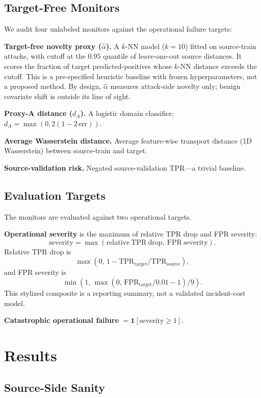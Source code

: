 \documentclass[10pt,conference]{IEEEtran}
\begin{document}
\subsection{Target-Free Monitors}
\label{sec:monitors}

We audit four unlabeled monitors against the operational failure targets:

\textbf{Target-free novelty proxy ($\hat{\alpha}$).} A $k$-NN model ($k{=}10$) fitted on source-train attacks, with cutoff at the $0.95$ quantile of leave-one-out source distances. It scores the fraction of target predicted-positives whose $k$-NN distance exceeds the cutoff. This is a pre-specified heuristic baseline with frozen hyperparameters, not a proposed method. By design, $\hat{\alpha}$ measures attack-side novelty only; benign covariate shift is outside its line of sight.

\textbf{Proxy-A distance ($d_A$).} A logistic domain classifier; $d_A = \max(0, 2(1 - 2\,\mathrm{err}))$.

\textbf{Average Wasserstein distance.} Average feature-wise transport distance (1D Wasserstein) between source-train and target.

\textbf{Source-validation risk.} Negated source-validation TPR---a trivial baseline.

\subsection{Evaluation Targets}

The monitors are evaluated against two operational targets.

\textbf{Operational severity} is the maximum of relative TPR drop and FPR severity:
\[
\mathrm{severity} = \max(\mathrm{relative\ TPR\ drop},\ \mathrm{FPR\ severity}).
\]
Relative TPR drop is
\[
\max(0,\, 1 - \mathrm{TPR}_{\mathrm{target}} / \mathrm{TPR}_{\mathrm{source}}),
\]
and FPR severity is
\[
\min(1,\, \max(0,\, \mathrm{FPR}_{\mathrm{target}} / 0.01 - 1) / 9).
\]
This stylized composite is a reporting summary, not a validated incident-cost model.

\textbf{Catastrophic operational failure} $= \mathbf{1}[\text{severity} \geq 1]$.

\section{Results}

\subsection{Source-Side Sanity}
\end{document}
